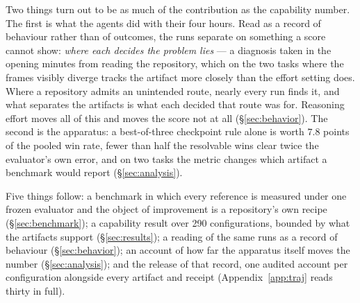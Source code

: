 Two things turn out to be as much of the contribution as the capability number.
The first is what the agents did with their four hours. Read as a record of behaviour rather than of
outcomes, the runs separate on something a score cannot show: \emph{where each decides the problem
lies} --- a diagnosis taken in the opening minutes from reading the repository, which on the two tasks
where the frames visibly diverge tracks the artifact more closely than the effort setting does. Where
a repository admits an unintended route, nearly every run finds it, and what separates the artifacts
is what each decided that route was for. Reasoning effort moves all of this and moves the score not at
all (\S\ref{sec:behavior}). The second is the apparatus: a best-of-three checkpoint rule alone is
worth $7.8$ points of the pooled win rate, fewer than half the resolvable wins clear twice the
evaluator's own error, and on two tasks the metric changes which artifact a benchmark would report
(\S\ref{sec:analysis}).

Five things follow: a benchmark in which every reference is measured under one frozen evaluator and
the object of improvement is a repository's own recipe (\S\ref{sec:benchmark}); a capability result
over 290 configurations, bounded by what the artifacts support (\S\ref{sec:results}); a reading of the
same runs as a record of behaviour (\S\ref{sec:behavior}); an account of how far the apparatus itself
moves the number (\S\ref{sec:analysis}); and the release of that record, one audited account per
configuration alongside every artifact and receipt (Appendix~\ref{app:traj} reads thirty in full).


